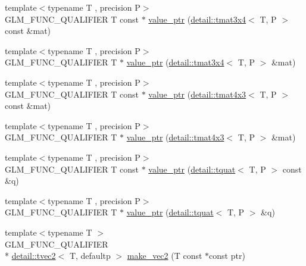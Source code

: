 \begin{DoxyCompactItemize}
\item 
{\footnotesize template$<$typename T , precision P$>$ }\\G\-L\-M\-\_\-\-F\-U\-N\-C\-\_\-\-Q\-U\-A\-L\-I\-F\-I\-E\-R T const $\ast$ \hyperlink{group__gtc__type__ptr_ga233effe326542ae9657b8feac80e541f}{value\-\_\-ptr} (\hyperlink{structglm_1_1detail_1_1tmat3x4}{detail\-::tmat3x4}$<$ T, P $>$ const \&mat)
\item 
{\footnotesize template$<$typename T , precision P$>$ }\\G\-L\-M\-\_\-\-F\-U\-N\-C\-\_\-\-Q\-U\-A\-L\-I\-F\-I\-E\-R T $\ast$ \hyperlink{group__gtc__type__ptr_gad8c6b1dbda2b48d19fd1bc8b01cf701c}{value\-\_\-ptr} (\hyperlink{structglm_1_1detail_1_1tmat3x4}{detail\-::tmat3x4}$<$ T, P $>$ \&mat)
\item 
{\footnotesize template$<$typename T , precision P$>$ }\\G\-L\-M\-\_\-\-F\-U\-N\-C\-\_\-\-Q\-U\-A\-L\-I\-F\-I\-E\-R T const $\ast$ \hyperlink{group__gtc__type__ptr_gaebe5b66d8b05f6ace85d26cedd03732d}{value\-\_\-ptr} (\hyperlink{structglm_1_1detail_1_1tmat4x3}{detail\-::tmat4x3}$<$ T, P $>$ const \&mat)
\item 
{\footnotesize template$<$typename T , precision P$>$ }\\G\-L\-M\-\_\-\-F\-U\-N\-C\-\_\-\-Q\-U\-A\-L\-I\-F\-I\-E\-R T $\ast$ \hyperlink{group__gtc__type__ptr_ga4a4b23867cc26441441ff4458844fa27}{value\-\_\-ptr} (\hyperlink{structglm_1_1detail_1_1tmat4x3}{detail\-::tmat4x3}$<$ T, P $>$ \&mat)
\item 
{\footnotesize template$<$typename T , precision P$>$ }\\G\-L\-M\-\_\-\-F\-U\-N\-C\-\_\-\-Q\-U\-A\-L\-I\-F\-I\-E\-R T const $\ast$ \hyperlink{group__gtc__type__ptr_ga961a5b150a0ffd632aaa0252c4d6b9ab}{value\-\_\-ptr} (\hyperlink{structglm_1_1detail_1_1tquat}{detail\-::tquat}$<$ T, P $>$ const \&q)
\item 
{\footnotesize template$<$typename T , precision P$>$ }\\G\-L\-M\-\_\-\-F\-U\-N\-C\-\_\-\-Q\-U\-A\-L\-I\-F\-I\-E\-R T $\ast$ \hyperlink{group__gtc__type__ptr_gab72389186ae9e8c822ff6cc9b474a37f}{value\-\_\-ptr} (\hyperlink{structglm_1_1detail_1_1tquat}{detail\-::tquat}$<$ T, P $>$ \&q)
\item 
{\footnotesize template$<$typename T $>$ }\\G\-L\-M\-\_\-\-F\-U\-N\-C\-\_\-\-Q\-U\-A\-L\-I\-F\-I\-E\-R \\*
\hyperlink{structglm_1_1detail_1_1tvec2}{detail\-::tvec2}$<$ T, defaultp $>$ \hyperlink{group__gtc__type__ptr_ga70f570befb4773ba3a658b76f9fdd6ab}{make\-\_\-vec2} (T const $\ast$const ptr)

\end{DoxyCompactItemize}
